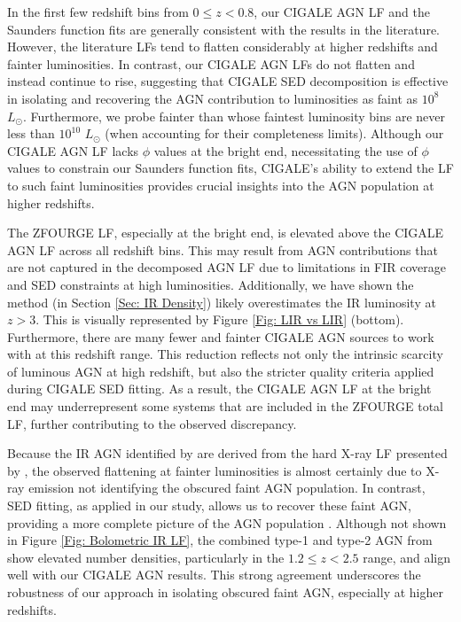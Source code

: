 In the first few redshift bins from $0 \leq z < 0.8$, our CIGALE AGN LF and the Saunders function fits are generally consistent with the results in the literature. However, the literature LFs tend to flatten considerably at higher redshifts and fainter luminosities. In contrast, our CIGALE AGN LFs do not flatten and instead continue to rise, suggesting that CIGALE SED decomposition is effective in isolating and recovering the AGN contribution to luminosities as faint as $10^8$ $L_{\odot}$. Furthermore, we probe fainter than \cite{thorne_deep_2022} whose faintest luminosity bins are never less than $10^{10}$ $L_{\odot}$ (when accounting for their completeness limits). Although our CIGALE AGN LF lacks $\phi$ values at the bright end, necessitating the use of \cite{thorne_deep_2022} $\phi$ values to constrain our Saunders function fits, CIGALE's ability to extend the LF to such faint luminosities provides crucial insights into the AGN population at higher redshifts. 

The ZFOURGE LF, especially at the bright end, is elevated above the CIGALE AGN LF across all redshift bins. This may result from AGN contributions that are not captured in the decomposed AGN LF due to limitations in FIR coverage and SED constraints at high luminosities. Additionally, we have shown the \cite{wuyts_fireworks_2008} method (in Section \ref{Sec: IR Density}) likely overestimates the IR luminosity at $z>3$. This is visually represented by Figure \ref{Fig: LIR vs LIR} (bottom). Furthermore, there are many fewer and fainter CIGALE AGN sources to work with at this redshift range. This reduction reflects not only the intrinsic scarcity of luminous AGN at high redshift, but also the stricter quality criteria applied during CIGALE SED fitting. As a result, the CIGALE AGN LF at the bright end may underrepresent some systems that are included in the ZFOURGE total LF, further contributing to the observed discrepancy.

Because the IR AGN identified by \cite{symeonidis_agn_2021} are derived from the hard X-ray LF presented by \cite{aird_evolution_2015}, the observed flattening at fainter luminosities is almost certainly due to X-ray emission not identifying the obscured faint AGN population. In contrast, SED fitting, as applied in our study, allows us to recover these faint AGN, providing a more complete picture of the AGN population \citep{gruppioni_modelling_2011, brown_infrared_2019, thorne_deep_2022}. Although not shown in Figure \ref{Fig: Bolometric IR LF}, the combined type-1 and type-2 AGN from \cite{symeonidis_agn_2021} show elevated number densities, particularly in the $1.2 \leq z < 2.5$ range, and align well with our CIGALE AGN results. This strong agreement underscores the robustness of our approach in isolating obscured faint AGN, especially at higher redshifts.

